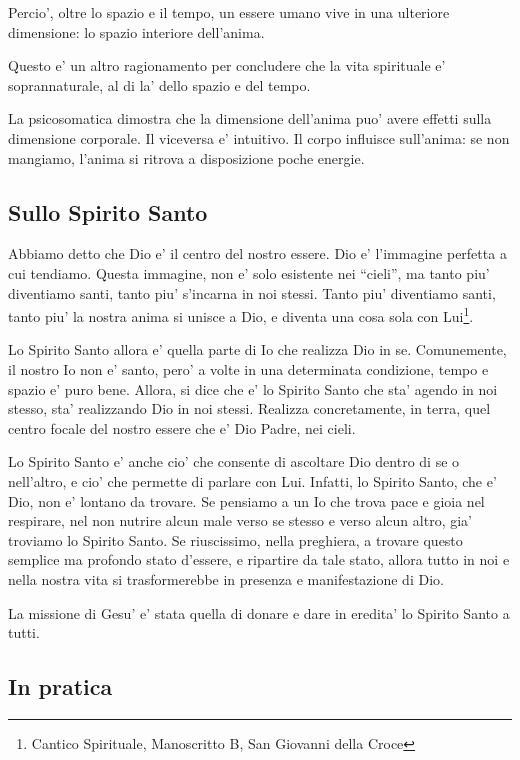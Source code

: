 Percio', oltre lo spazio e il tempo, un essere umano vive in una ulteriore dimensione: lo spazio interiore dell'anima.

Questo e' un altro ragionamento per concludere che la vita spirituale e' soprannaturale, al di la' dello spazio e del tempo.

La psicosomatica dimostra che la dimensione dell'anima puo' avere effetti sulla dimensione corporale. Il viceversa e' intuitivo. Il corpo influisce sull'anima: se non mangiamo, l'anima si ritrova a disposizione poche energie.


\subsection{Sullo Spirito Santo}
Abbiamo detto che Dio e' il centro del nostro essere. Dio e' l'immagine perfetta a cui tendiamo. Questa immagine, non e' solo esistente nei ``cieli'', ma tanto piu' diventiamo santi, tanto piu' s'incarna in noi stessi. Tanto piu' diventiamo santi, tanto piu' la nostra anima si unisce a Dio, e diventa una cosa sola con Lui\footnote{Cantico Spirituale, Manoscritto B, San Giovanni della Croce}.

Lo Spirito Santo allora e' quella parte di Io che realizza Dio in se. Comunemente, il nostro Io non e' santo, pero' a volte in una determinata condizione, tempo e spazio e' puro bene. Allora, si dice che e' lo Spirito Santo che sta' agendo in noi stesso, sta' realizzando Dio in noi stessi. Realizza concretamente, in terra, quel centro focale del nostro essere che e' Dio Padre, nei cieli. 

Lo Spirito Santo e' anche cio' che consente di ascoltare Dio dentro di se o nell'altro, e cio' che permette di parlare con Lui. Infatti, lo Spirito Santo, che e' Dio, non e' lontano da trovare. Se pensiamo a un Io che trova pace e gioia nel respirare, nel non nutrire alcun male verso se stesso e verso alcun altro, gia' troviamo lo Spirito Santo. Se riuscissimo, nella preghiera, a trovare questo semplice ma profondo stato d'essere, e ripartire da tale stato, allora tutto in noi e nella nostra vita si trasformerebbe in presenza e manifestazione di Dio.

La missione di Gesu' e' stata quella di donare e dare in eredita' lo Spirito Santo a tutti.

\subsection{In pratica}

